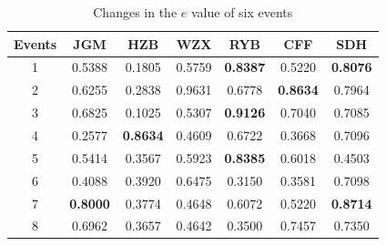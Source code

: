 \documentclass[runningheads]{llncs}
\begin{document}
\begin{table}
\caption{Changes in the $e$ value of six events}\label{table:beta}
\begin{center}
\begin{tabular}{|c|c|c|c|c|c|c|}
\hline
Events & JGM                                  & HZB                                  & WZX                                  & RYB                                  & CFF                                  & SDH                                  \\ \hline
1      & 0.5388                               & 0.1805                               & 0.5759                               & \textbf{0.8387}                      & 0.5220                               & \textbf{0.8076}                      \\
2      & 0.6255                               & 0.2838                               & 0.9631                               & 0.6778                               & \textbf{0.8634}                      & 0.7964                               \\
3      & 0.6825                               & 0.1025                               & 0.5307                               & \textbf{0.9126}                      & 0.7040                               & 0.7085                               \\
4      & 0.2577                               & \textbf{0.8634}                      & 0.4609                               & 0.6722                               & 0.3668                               & 0.7096                               \\
5      & 0.5414                               & 0.3567                               & 0.5923                               & \textbf{0.8385}                      & 0.6018                               & 0.4503                               \\
6      & 0.4088                               & 0.3920                               & 0.6475                               & 0.3150                               & 0.3581                               & 0.7098                               \\
7      & \textbf{0.8000}                      & 0.3774                               & 0.4648                               & 0.6072                               & 0.5220                               & \textbf{0.8714}                      \\
8      & 0.6962                               & 0.3657                               & 0.4642                               & 0.3500                               & 0.7457                               & 0.7350                               \\

\end{tabular}
\end{center}
\end{table}
\end{document}
